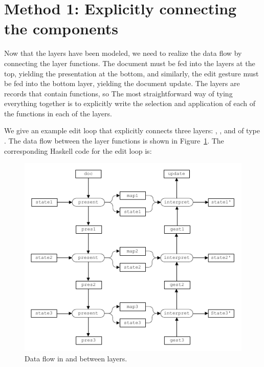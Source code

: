 \documentclass[preprint,natbib]{sigplanconf}
\begin{document}
%																
%																
%																
\section{Method 1: Explicitly connecting the components} \label{sect:simple}

Now that the layers have been modeled, we need to realize the data flow by connecting the layer functions. The document must be fed into the layers at the top, yielding the presentation at the bottom, and similarly, the edit gesture must be fed into the bottom layer, yielding the document update. \bc The layers are records that contain functions, so  \ec The most straightforward way of tying everything together is to explicitly write the selection and application of each of the functions in each of the layers. 

We give an example edit loop that explicitly connects three layers: , , and  of type . The data flow between the layer functions is shown in Figure~\ref{explicit}. The corresponding Haskell code for the edit loop is:



\begin{figure}
\includegraphics[width=\columnwidth]{images/LayersDataFlow}
\caption{Data flow in and between layers.} \label{explicit} 
\end{figure}
\end{document}
